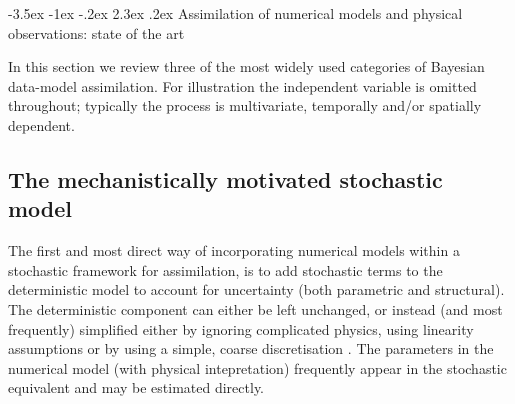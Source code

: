 \documentclass[10pt,a4paper]{article}
\makeatletter
\renewcommand\section{\@startsection{section}{1}{\z@}%
                                  {-3.5ex \@plus -1ex \@minus -.2ex}%
                                  {2.3ex \@plus.2ex}%
                                  {\normalfont\large\bfseries}}
\makeatother
\begin{document}

 


\section{Assimilation of numerical models and physical observations: state of the art}

In this section we review three of the most widely used categories of Bayesian data-model assimilation. For illustration the independent variable is omitted throughout; typically the process is multivariate, temporally and/or spatially dependent. 

\subsection{The mechanistically motivated stochastic model}

The first and most direct way of incorporating numerical models within a stochastic framework for assimilation, is to add stochastic terms to the deterministic model to account for uncertainty (both parametric and structural). The deterministic component can either be left unchanged, or instead (and most frequently) simplified either by ignoring complicated physics, using linearity assumptions or by using a simple, coarse discretisation \citep{Berliner_2003}. The parameters in the numerical model (with physical intepretation) frequently appear in the stochastic equivalent and may be estimated directly. 
\end{document}
